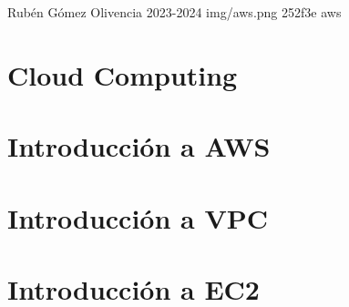 \documentclass{\ClassPath/yukibook}
\begin{document}
    {Rubén Gómez Olivencia}  %
    {2023-2024}    %
    {} %
    {} %
    {} %
    {img/aws.png} %
    {252f3e}
    {aws} %

    \coverpage
    \graphicspath{{../../yukibook.cls/}}
    \licensepage

    \tableofcontents

    \graphicspath{{img/}}

    \part{Cloud Computing}
    
    
    \part{Introducción a AWS}
    
    
    \part{Introducción a VPC}
    

    \part{Introducción a EC2}
    
    
%    
\end{document}
